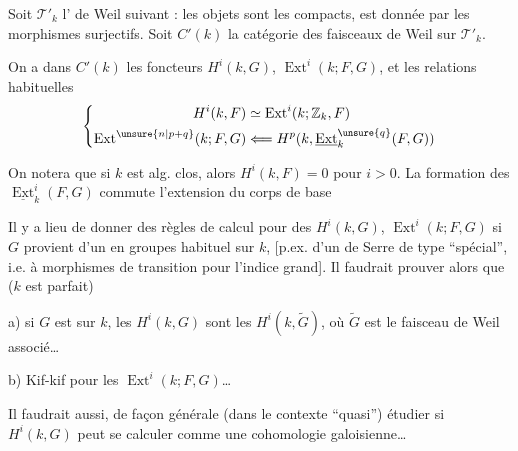 Soit $\mathcal T'_k$ l' de Weil suivant : les objets sont les
  compacts, 
est donnée par les morphismes  
surjectifs. Soit $C'(k)$ la catégorie des faisceaux de Weil sur $\mathcal T'_k$.


On a dans $C'(k)$ les foncteurs $H^i(k,G)$,
$\operatorname{Ext}^i(k;F,G)$, 
et les relations habituelles
\[
\left\{\begin{aligned}
 H^i(k,F)&\simeq\operatorname{Ext}^i(k;\mathbb Z_k,F)\\
 \operatorname{Ext}^{\unsure{n|p+q}}(k;F,G)&\Longleftarrow
 H^p(k,\underline{\operatorname{Ext}}^{\unsure{q}}_k(F,G))
\end{aligned}\right.
\]

On notera que si $k$ est alg. clos, alors
$H^i(k,F)=0$ pour $i>0$. La formation des
$\underline{\operatorname{Ext}}^i_k(F,G)$ commute 
l'extension du corps de base\unsure{\ldots}

Il y a lieu de  donner des règles de calcul
pour des $H^i(k,G)$, $\operatorname{Ext}^i(k;F,G)$ si $G$ provient d'un
 en groupes habituel sur $k$,
[p.ex. d'un  de Serre de type ``spécial'', i.e. à
morphismes de transition  pour l'indice grand\unsure{\ldots}].
Il faudrait prouver alors que ($k$ est parfait)

\noindent a) si $G$ est  sur $k$, les $H^i(k,G)$ sont les
$H^i(k,\widetilde G)$, où $\widetilde G$ est le faisceau de Weil associé\ldots

\noindent b) Kif-kif pour les $\operatorname{Ext}^i(k;F,G)$\ldots
{}

Il faudrait aussi, de façon générale (dans le contexte ``quasi'') étudier
 si $H^i(k,G)$ peut se calculer comme une cohomologie
galoisienne\ldots
{}

